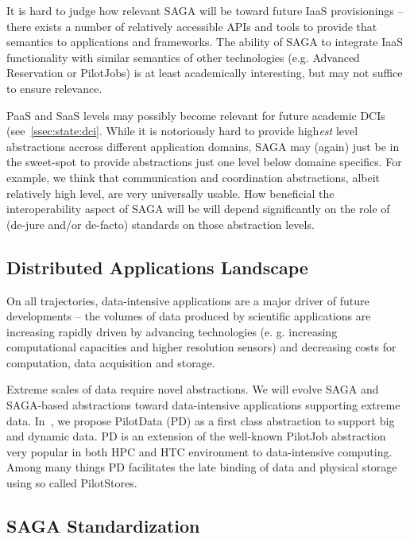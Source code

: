 \documentclass[]{article}
\newcommand{\I}[1]{\textit{#1}}
\begin{document}
  It is hard to judge how relevant SAGA will be toward future IaaS
  provisionings -- there exists a number of relatively accessible APIs
  and tools to provide that semantics to applications and frameworks.
  The ability of SAGA to integrate IaaS functionality with similar
  semantics of other technologies (e.g. Advanced Reservation or
  PilotJobs) is at least academically interesting, but may not suffice
  to ensure relevance.

  PaaS and SaaS levels may possibly become relevant for future
  academic DCIs (see~\ref{ssec:state:dci}.  While it is notoriously
  hard to provide high\I{est} level abstractions accross different
  application domains, SAGA may (again) just be in the sweet-spot to
  provide abstractions just one level below domaine specifics.  For
  example, we think that communication and coordination abstractions,
  albeit relatively high level, are very universally usable.  How
  beneficial the interoperability aspect of SAGA will be will depend
  significantly on the role of (de-jure and/or de-facto) standards on
  those abstraction levels.


 \subsection{Distributed Applications Landscape}
 
  On all trajectories, data-intensive applications are a major driver of
  future developments -- the volumes of data produced by scientific
  applications are increasing rapidly driven by advancing technologies
  (e. g. increasing computational capacities and higher resolution
  sensors) and decreasing costs for computation, data acquisition and
  storage.

  Extreme scales of data require novel abstractions. We will evolve SAGA
  and SAGA-based abstractions toward data-intensive applications
  supporting extreme data.  In~\cite{troy-2011}, we propose PilotData
  (PD) as a first class abstraction to support big and dynamic data. PD
  is an extension of the well-known PilotJob abstraction very popular in
  both HPC and HTC environment to data-intensive computing.  Among many
  things PD facilitates the late binding of data and physical storage
  using so called PilotStores.

 \subsection{SAGA Standardization}
\end{document}
